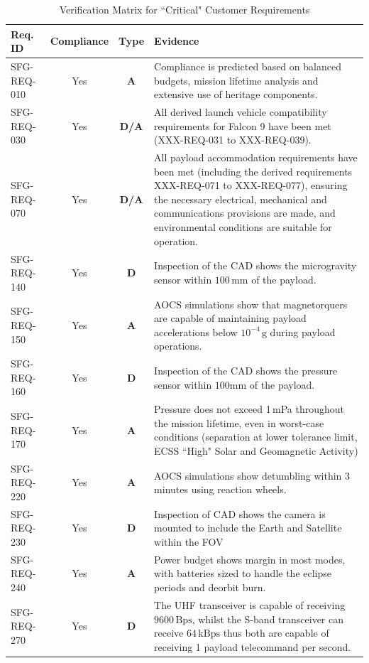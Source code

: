 \documentclass[a4paper, 11pt, conference]{IEEEtran}
\begin{document}
\begin{table}[!htbp]
\centering
\caption{Verification Matrix for ``Critical" Customer Requirements}
\begin{tabularx}{\textwidth}{l c c X}
\toprule
\textbf{Req. ID} & \textbf{Compliance} & \textbf{Type} & \textbf{Evidence}\\
\midrule
SFG-REQ-010 & Yes & \textbf{A} & Compliance is predicted based on balanced budgets, mission lifetime analysis and extensive use of heritage components.\\
SFG-REQ-030 & Yes & \textbf{D/A} & All derived launch vehicle compatibility requirements for Falcon 9 have been met (XXX-REQ-031 to XXX-REQ-039). \\
SFG-REQ-070 & Yes & \textbf{D/A} & All payload accommodation requirements have been met (including the derived requirements XXX-REQ-071 to XXX-REQ-077), ensuring the necessary electrical, mechanical and communications provisions are made, and environmental conditions are suitable for operation. \\
SFG-REQ-140 & Yes & \textbf{D} & Inspection of the CAD shows the microgravity sensor within $100\,\mathrm{mm}$ of the payload. \\
SFG-REQ-150 & Yes & \textbf{A} & AOCS simulations show that magnetorquers are capable of maintaining payload accelerations below $10^{-4}\,\mathrm{g}$ during payload operations. \\
SFG-REQ-160 & Yes & \textbf{D} & Inspection of the CAD shows the pressure sensor within $100\mathrm{mm}$ of the payload. \\
SFG-REQ-170 & Yes & \textbf{A} & Pressure does not exceed 1\,mPa throughout the mission lifetime, even in worst-case conditions (separation at lower tolerance limit, ECSS ``High" Solar and Geomagnetic Activity)\\
SFG-REQ-220 & Yes & \textbf{A} & AOCS simulations show detumbling within 3 minutes using reaction wheels.\\
SFG-REQ-230 & Yes & \textbf{D} & Inspection of CAD shows the camera is mounted to include the Earth and Satellite within the FOV \\
SFG-REQ-240 & Yes & \textbf{A} & Power budget shows margin in most modes, with batteries sized to handle the eclipse periods and deorbit burn. \\
SFG-REQ-270 & Yes & \textbf{D} & The UHF transceiver is capable of receiving $9600\,\mathrm{Bps}$, whilst the S-band transceiver can receive $64\,\mathrm{kBps}$ thus both are capable of receiving 1 payload telecommand per second. \\

\end{tabularx}
\end{table}
\end{document}

